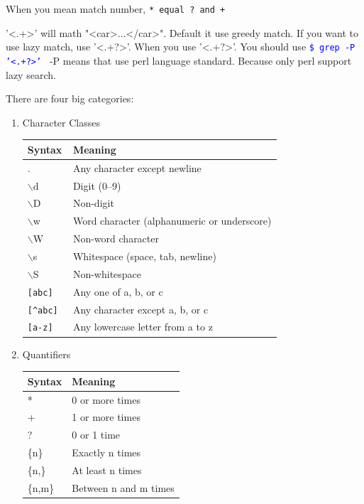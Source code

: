 \documentclass[paper=8.5in:11in, twoside, 12pt, pagesize=pdftex]{book}
\newcommand{\linuxcommand}[1]{\texttt{\textcolor{blue}{\$ #1 \Pisymbol{psy}{191}}}}
\begin{document}
	When you mean match number, \verb=* equal ? and + = 


'<.+>' will math "<car>...</car>". Default it use greedy match. If you want to use lazy match, use '<.+?>'. When you use '<.+?>'.  You should use \linuxcommand{grep -P '<.+?>'} -P means that use perl language standard. Because only perl support lazy search.  

		There are four big categories: 
\begin{enumerate}
	\item Character Classes \\
	
	\begin{tabular}{|l|l|}
		\hline
		\textbf{Syntax} & \textbf{Meaning} \\
		\hline
		\hline .        &  Any character except newline \\
		\hline $\backslash$d       & Digit (0–9) \\
		\hline $\backslash$D       & Non-digit \\
		\hline $\backslash$w       & Word character (alphanumeric or underscore) \\
		\hline $\backslash$W       & Non-word character \\
		\hline $\backslash$s       & Whitespace (space, tab, newline) \\
		\hline $\backslash$S       & Non-whitespace \\
		\hline \texttt{[abc]}    & Any one of a, b, or c \\
		\hline \texttt{[\textasciicircum abc] }   & Any character except a, b, or c \\
		\hline \texttt{[a-z]}    & Any lowercase letter from a to z \\
		\hline
	\end{tabular}
	
	\item  Quantifiers \\
	\begin{tabular}{|l|l|}
		\hline
		\textbf{Syntax} & \textbf{Meaning} \\
		\hline
		\hline *        & 0 or more times \\
		\hline +        & 1 or more times \\
		\hline ?        & 0 or 1 time \\
		\hline \{n\}     & Exactly n times \\
		\hline \{n,\}    & At least n times \\
		\hline \{n,m\}   & Between n and m times \\
		\hline
	\end{tabular}
	

\end{enumerate}
\end{document}
